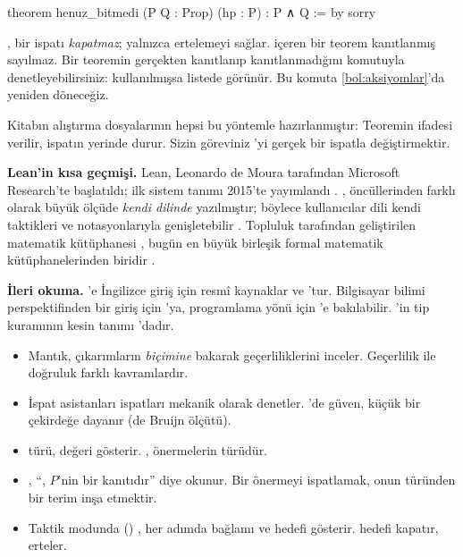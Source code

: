 \begin{leankod}
theorem henuz_bitmedi (P Q : Prop) (hp : P) : P ∧ Q := by
  sorry
\end{leankod}

\begin{dikkat}
, bir ispatı \emph{kapatmaz}; yalnızca ertelemeyi sağlar.
 içeren bir teorem kanıtlanmış sayılmaz. Bir teoremin
gerçekten kanıtlanıp kanıtlanmadığını \lc{\textcolor{leancmd}{\bfseries\#print axioms}}
komutuyla denetleyebilirsiniz:  kullanılmışsa listede
 görünür. Bu komuta \cref{bol:aksiyomlar}'da yeniden döneceğiz.
\end{dikkat}

Kitabın alıştırma dosyalarının hepsi bu yöntemle hazırlanmıştır: Teoremin
ifadesi verilir, ispatın yerinde  durur. Sizin göreviniz
'yi gerçek bir ispatla değiştirmektir.

\begin{arastirmanotu}
\textbf{Lean'in kısa geçmişi.} Lean, Leonardo de Moura tarafından Microsoft
Research'te başlatıldı; ilk sistem tanımı 2015'te yayımlandı
\citep{demoura2015lean}. \Lean{}, öncüllerinden farklı olarak büyük ölçüde
\emph{kendi dilinde} yazılmıştır; böylece kullanıcılar dili kendi taktikleri
ve notasyonlarıyla genişletebilir \citep{demoura2021lean4}. Topluluk
tarafından geliştirilen matematik kütüphanesi \Mathlib{}, bugün en büyük
birleşik formal matematik kütüphanelerinden biridir \citep{mathlib2020}.

\textbf{İleri okuma.} \Lean{}'e İngilizce giriş için resmî kaynaklar
\citet{tpil4} ve \citet{logicandproof}'tur. Bilgisayar bilimi
perspektifinden bir giriş için \citet{hitchhiker2026}'ya, programlama
yönü için \citet{fpil}'e bakılabilir. \Lean{}'in tip kuramının kesin
tanımı \citet{carneiro2019}'dadır.
\end{arastirmanotu}

\begin{bolumozeti}
\begin{itemize}
  \item Mantık, çıkarımların \emph{biçimine} bakarak geçerliliklerini
        inceler. Geçerlilik ile doğruluk farklı kavramlardır.
  \item İspat asistanları ispatları mekanik olarak denetler. \Lean{}'de
        güven, küçük bir çekirdeğe dayanır (de Bruijn ölçütü).
  \item \lc{\textcolor{leancmd}{\bfseries\#check}} türü,
        \lc{\textcolor{leancmd}{\bfseries\#eval}} değeri gösterir.
        , önermelerin türüdür.
  \item {}, ``, $P$'nin bir kanıtıdır'' diye okunur.
        Bir önermeyi ispatlamak, onun türünden bir terim inşa etmektir.
  \item Taktik modunda () \Lean{}, her adımda bağlamı ve hedefi
        gösterir.  hedefi kapatır,  erteler.
\end{itemize}
\end{bolumozeti}

